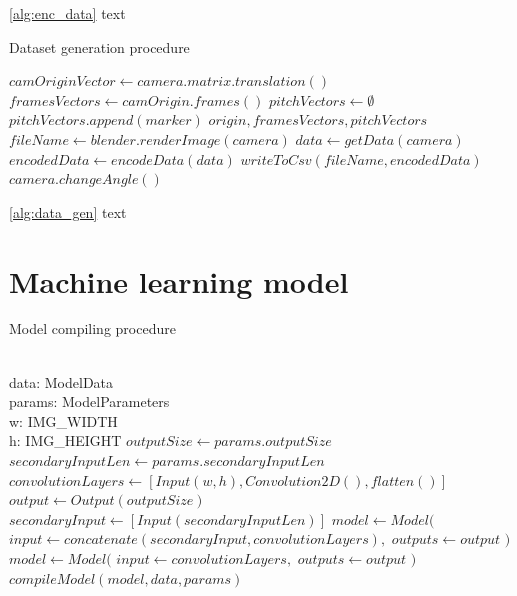 \documentclass[
11pt,
twoside
]{report}
\begin{document}
\ref{alg:enc_data} text


\begin{algorithm}[H]
\begin{algorithmic}
\caption{Dataset generation procedure}\label{alg:data_gen}
    \State $camOriginVector \gets camera.matrix.translation()$
    \State $framesVectors \gets camOrigin.frames()$
    \State $pitchVectors \gets \emptyset$
        \State $pitchVectors.append(marker)$
    \EndFor
    \State
    \Return $origin, framesVectors, pitchVectors$
\EndProcedure
{}
    \State $fileName \gets blender.renderImage(camera)$
    \State $data \gets getData(camera)$
    \State $encodedData \gets encodeData(data)$
    \State $writeToCsv(fileName, encodedData)$
    \State $camera.changeAngle()$
\EndFor
\end{algorithmic}
\end{algorithm}


\ref{alg:data_gen} text




\section{Machine learning model}



\begin{algorithm}[H]
\begin{algorithmic}
\caption{Model compiling procedure}\label{alg:model_comp}
\Require \\
    data: ModelData \\
    params: ModelParameters \\
    w: IMG\_WIDTH \\
    h: IMG\_HEIGHT
\State
\State $outputSize \gets params.outputSize$
\State $secondaryInputLen \gets params.secondaryInputLen$
\State $convolutionLayers \gets [Input(w, h), Convolution2D(), flatten()]$
\State $output \gets Output(outputSize)$
    \State $secondaryInput \gets [Input(secondaryInputLen)]$
    \State $model \gets Model($
        \State \indent $input \gets concatenate(secondaryInput, convolutionLayers),$
            \State \indent $outputs \gets output$
    \State $)$
\Else
    \State $model \gets Model($
        \State \indent $input \gets convolutionLayers,$
        \State \indent $outputs \gets output$
    \State $)$
\EndIf
\State $compileModel(model, data, params)$
\end{algorithmic}
\end{algorithm}
\end{document}
